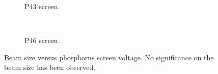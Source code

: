 \begin{figure}[!ht]
	\begin{subfigure}[t]{0.5\textwidth}
		
		\caption{P43 screen.}
		\label{}
	\end{subfigure}
	~
	\begin{subfigure}[t]{0.5\textwidth}
		
		\caption{P46 screen.}
		\label{}
	\end{subfigure}
	\caption[Beam size versus phosphorus screen voltage.]{Beam size versus phosphorus screen voltage. No significance on the beam size has been observed.}
	\label{chap4:P_size}
\end{figure}
